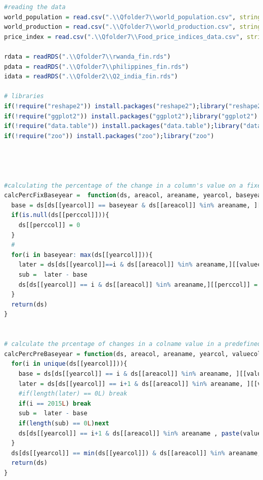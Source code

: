 \documentclass[11pt]{article}
\begin{document}
\begin{lstlisting}[language= R]
#reading the data  
world_population = read.csv(".\\Qfolder7\\world_population.csv", stringsAsFactors = FALSE, sep = ",", header = TRUE)
world_production = read.csv(".\\Qfolder7\\world_production.csv", stringsAsFactors = FALSE, sep = ",", header = TRUE)
price_index = read.csv(".\\Qfolder7\\Food_price_indices_data.csv", stringsAsFactors = FALSE, sep = ",")

rdata = readRDS(".\\Qfolder7\\rwanda_fin.rds")
pdata = readRDS(".\\Qfolder7\\philippines_fin.rds")
idata = readRDS(".\\Qfolder2\\Q2_india_fin.rds")

# libraries 
if(!require("reshape2")) install.packages("reshape2");library("reshape2")
if(!require("ggplot2")) install.packages("ggplot2");library("ggplot2")
if(!require("data.table")) install.packages("data.table");library("data.table")
if(!require("zoo")) install.packages("zoo");library("zoo")




#calculating the percentage of the change in a column's value on a fixed base year 
calcPercFixBaseyear =  function(ds, areacol, areaname, yearcol, baseyear,valuecol, perccol){
  base = ds[ds[[yearcol]] == baseyear & ds[[areacol]] %in% areaname, ][[valuecol]]
  if(is.null(ds[[perccol]])){
    ds[[perccol]] = 0 
  }
  #
  for(i in baseyear: max(ds[[yearcol]])){
    later = ds[ds[[yearcol]]==i & ds[[areacol]] %in% areaname,][[valuecol]]
    sub =  later - base
    ds[ds[[yearcol]] == i & ds[[areacol]] %in% areaname,][[perccol]] = (sub / later) * 100
  }
  return(ds)
}


# calculate the prcentage of changes in a colname value in a predefined year, where the base is for every change is the value from the previous year.
calcPercPreBaseyear = function(ds, areacol, areaname, yearcol, valuecol){
  for(i in unique(ds[[yearcol]])){
    base = ds[ds[[yearcol]] == i & ds[[areacol]] %in% areaname, ][[valuecol]]
    later = ds[ds[[yearcol]] == i+1 & ds[[areacol]] %in% areaname, ][[valuecol]]
    #if(length(later) == 0L) break
    if(i == 2015L) break
    sub =  later - base
    if(length(sub) == 0L)next 
    ds[ds[[yearcol]] == i+1 & ds[[areacol]] %in% areaname , paste(valuecol, "Percent", sep = "_")]= (sub / later) * 100
  }
  ds[ds[[yearcol]] == min(ds[[yearcol]]) & ds[[areacol]] %in% areaname, paste(valuecol, "Percent", sep = "_")]= 0
  return(ds)
}


\end{lstlisting}
\end{document}
